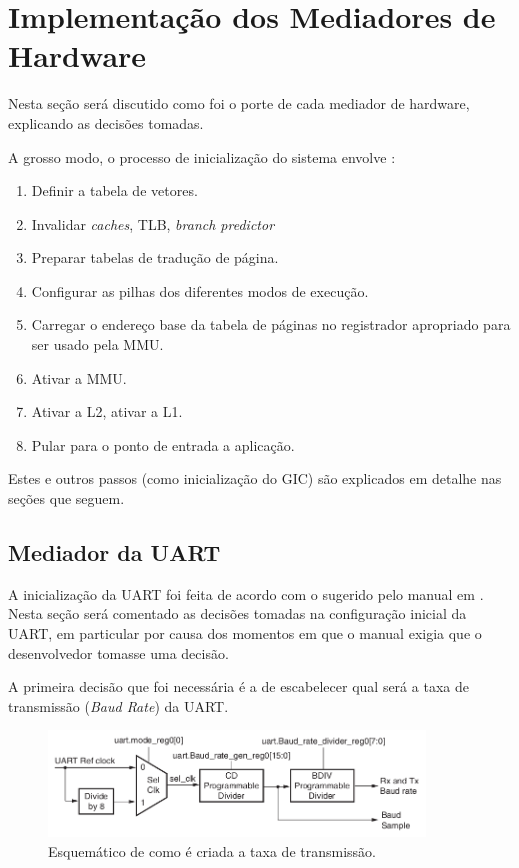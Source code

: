 \chapter{Implementação dos Mediadores de Hardware}


Nesta seção será discutido como foi o porte de cada mediador de hardware, explicando as decisões tomadas.

A grosso modo, o processo de inicialização do sistema envolve \cite[p.~110]{ug585.1.7}:


\begin{enumerate}
	\item Definir a tabela de vetores.
	\item Invalidar \emph{caches}, TLB, \emph{branch predictor}
	\item Preparar tabelas de tradução de página.
	\item Configurar as pilhas dos diferentes modos de execução.
	\item Carregar o endereço base da tabela de páginas no registrador apropriado para ser usado pela MMU.
	\item Ativar a MMU.
	\item Ativar a L2, ativar a L1.
	\item Pular para o ponto de entrada a aplicação.
\end{enumerate}

Estes e outros passos (como inicialização do GIC) são explicados em detalhe nas seções que seguem.


\section{Mediador da UART}

A inicialização da UART foi feita de acordo com o sugerido pelo manual em \cite[p.~554]{ug585}. Nesta seção será comentado as decisões tomadas na configuração inicial da UART, em particular por causa dos momentos em que o manual exigia que o desenvolvedor tomasse uma decisão.

A primeira decisão que foi necessária é a de escabelecer qual será a taxa de transmissão (\emph{Baud Rate}) da UART. 

\begin{figure}[ht!]
    \centering
    \includegraphics[width=10cm]{figuras/uart_board_rate}
    \caption{Esquemático de como é criada a taxa de transmissão.}
	\label{fig:uart}
\end{figure}

